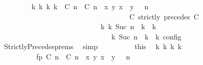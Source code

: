 \begin{isabellebody}
\ \ \ \ \ \ \ \ \isamarkupfalse%
\ {\isacartoucheopen}{\isasymexists}{\isasymGamma}\isactrlsub k\ {\isasymPsi}\isactrlsub k\ {\isasymPhi}\isactrlsub k\ k{\isachardot}\ {\isacharparenleft}{\isacharparenleft}{\isacharparenleft}{\isacharparenleft}{\isasymlceil}{\isacharhash}\isactrlsup {\isasymle}\ C\ n{\isacharcomma}\ {\isacharhash}\isactrlsup {\isacharless}\ C\ n{\isasymrceil}\ {\isasymin}\ {\isacharparenleft}{\isasymlambda}{\isacharparenleft}x{\isacharcomma}\ y{\isacharparenright}{\isachardot}\ x\ {\isasymle}\ y{\isacharparenright}{\isacharparenright}\ {\isacharhash}\ {\isasymGamma}{\isacharparenright}{\isacharcomma}\ n\isanewline
\ \ \ \ \ \ \ \ \ \ \ \ \ \ \ \ \ \ \ \ \ \ \ \ \ \ \ \ \ \ \ \ \ \ {\isasymturnstile}\ {\isasymPsi}\ {\isasymtriangleright}\ {\isacharparenleft}{\isacharparenleft}C\ strictly\ precedes\ C\ {\isacharhash}\ {\isasymPhi}{\isacharparenright}{\isacharparenright}\isanewline
\ \ \ \ \ \ \ \ \ \ \ \ \ \ \ \ \ \ \ \ \ \ \ \ \ \ \ \ \ {\isasymhookrightarrow}\isactrlbsup k\isactrlesup \ {\isacharparenleft}{\isasymGamma}\isactrlsub k{\isacharcomma}\ Suc\ n\ {\isasymturnstile}\ {\isasymPsi}\isactrlsub k\ {\isasymtriangleright}\ {\isasymPhi}\isactrlsub k{\isacharparenright}{\isacharparenright}\isanewline
\ \ \ \ \ \ \ \ \ \ \ \ \ \ \ \ \ \ \ \ \ \ \ \ \ \ \ \ {\isasymand}\ {\isacharparenleft}{\isasymrho}\ {\isasymin}\ {\isasymlbrakk}\ {\isasymGamma}\isactrlsub k{\isacharcomma}\ Suc\ n\ {\isasymturnstile}\ {\isasymPsi}\isactrlsub k\ {\isasymtriangleright}\ {\isasymPhi}\isactrlsub k\ {\isasymrbrakk}\isactrlsub c\isactrlsub o\isactrlsub n\isactrlsub f\isactrlsub i\isactrlsub g{\isacharparenright}{\isacartoucheclose}\isanewline
\ \ \ \ \ \ \ \ \ \ \isamarkupfalse%
\ \ StrictlyPrecedes{\isachardot}prems\ \isamarkupfalse%
\ simp\isanewline
\ \ \ \ \ \ \ \ \isamarkupfalse%
\ this\ \isamarkupfalse%
\ {\isasymGamma}\isactrlsub k\ {\isasymPsi}\isactrlsub k\ {\isasymPhi}\isactrlsub k\ k\isanewline
\ \ \ \ \ \ \ \ \ \ \ fp{\isacharcolon}{\isacartoucheopen}{\isacharparenleft}{\isacharparenleft}{\isacharparenleft}{\isasymlceil}{\isacharhash}\isactrlsup {\isasymle}\ C\ n{\isacharcomma}\ {\isacharhash}\isactrlsup {\isacharless}\ C\ n{\isasymrceil}\ {\isasymin}\ {\isacharparenleft}{\isasymlambda}{\isacharparenleft}x{\isacharcomma}\ y{\isacharparenright}{\isachardot}\ x\ {\isasymle}\ y{\isacharparenright}{\isacharparenright}\ {\isacharhash}\ {\isasymGamma}{\isacharparenright}{\isacharcomma}\ n\isanewline

\end{isabellebody}
